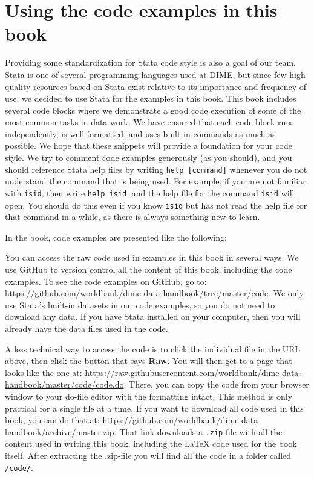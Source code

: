 \section{Using the code examples in this book}

Providing some standardization for Stata code style
is also a goal of our team.
Stata is one of several programming languages used at DIME,
but since few high-quality resources based on Stata exist
relative to its importance and frequency of use,
we decided to use Stata for the examples in this book.
This book includes several code blocks
where we demonstrate a good code execution
of some of the most common tasks in data work.
We have ensured that each code block runs independently,
is well-formatted, 
and uses built-in commands as much as possible.
We hope that these snippets will provide a foundation for your code style.
We try to comment code examples generously (as you should),
and you should reference Stata help files by writing \texttt{help [command]}
whenever you do not understand the command that is being used.
For example, if you are not familiar with \texttt{isid},
 then write \texttt{help isid},
and the help file for the command \texttt{isid} will open.
You should do this even if you know \texttt{isid} 
but has not read the help file for that command in a while,
as there is always something new to learn.

In the book, code examples are presented like the following:


You can access the raw code used in examples in this book in several ways.
We use GitHub to version control all the content of this book,
including the code examples.
To see the code examples on GitHub, go to: 
\url{https://github.com/worldbank/dime-data-handbook/tree/master/code}.
We only use Stata's built-in datasets in our code examples,
so you do not need to download any data.
If you have Stata installed on your computer, 
then you will already have the data files used in the code.

A less technical way to access the code 
is to click the individual file in the URL above, then click
the button that says \textbf{Raw}. 
You will then get to a page that looks like the one at:
\url{https://raw.githubusercontent.com/worldbank/dime-data-handbook/master/code/code.do}.
There, you can copy the code 
from your browser window to your do-file editor with the formatting intact.
This method is only practical for a single file at a time.
If you want to download all code used in this book, you can do that at:
\url{https://github.com/worldbank/dime-data-handbook/archive/master.zip}. 
That link downloads a \texttt{.zip} file 
with all the content used in writing this book, 
including the \LaTeX{} code used for the book itself. 
After extracting the .zip-file you will find all the code in a folder called \texttt{/code/}.

